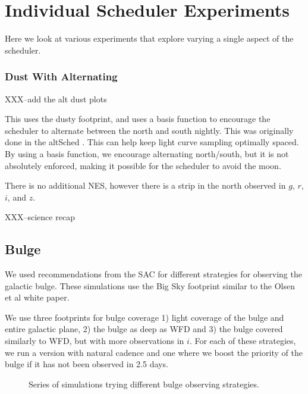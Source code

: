 

\section{Individual Scheduler Experiments}

Here we look at various experiments that explore varying a single aspect of the scheduler. 


\subsubsection{Dust With Alternating}

XXX--add the alt dust plots
\begin{figure}
\caption{}\label{fig:altdust}
\end{figure}
This uses the dusty footprint, and uses a basis function to encourage the scheduler to alternate between the north and south nightly. This was originally done in the altSched \citep{Rothchild19}. This can help keep light curve sampling optimally spaced. By using a basis function, we encourage alternating north/south, but it is not absolutely enforced, making it possible for the scheduler to avoid the moon.

There is no additional NES, however there is a strip in the north observed in $g$, $r$, $i$, and $z$.


XXX--science recap




\subsection{Bulge}

We used recommendations from the SAC for different strategies for observing the galactic bulge. These simulations use the Big Sky footprint similar to the Olsen et al white paper.  

We use three footprints for bulge coverage 1) light coverage of the bulge and entire galactic plane, 2) the bulge as deep as WFD and 3) the bulge covered similarly to WFD, but with more observations in $i$.  For each of these strategies, we run a version with natural cadence and one where we boost the priority of the bulge if it has not been observed in 2.5 days. 

\begin{figure}
\caption{Series of simulations trying different bulge observing strategies.}\label{fig:bulge}
\end{figure}



